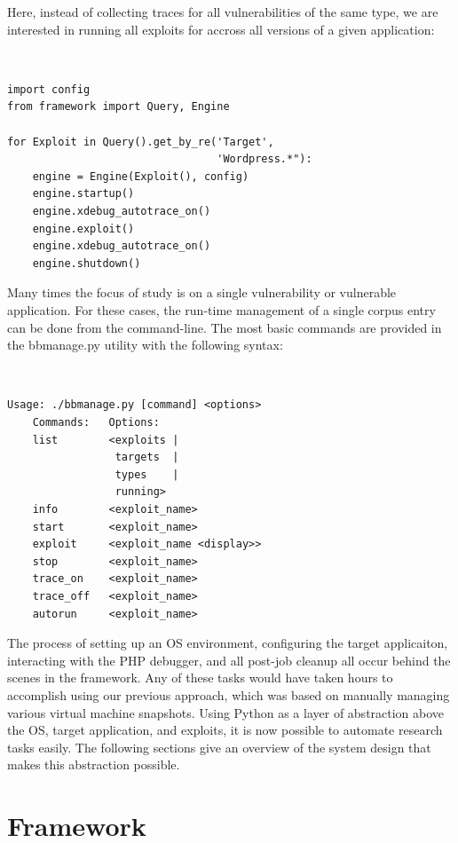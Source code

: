 \documentclass[letterpaper,twocolumn,10pt]{article}
\begin{document}

Here, instead of collecting traces for all vulnerabilities of the same type, we are interested in running all exploits for accross all versions of a given application:

{\tt \footnotesize
\begin{verbatim}
import config
from framework import Query, Engine

for Exploit in Query().get_by_re('Target', 
                                 'Wordpress.*"):
    engine = Engine(Exploit(), config)
    engine.startup()
    engine.xdebug_autotrace_on()
    engine.exploit()
    engine.xdebug_autotrace_on()
    engine.shutdown()
\end{verbatim}
}

Many times the focus of study is on a single vulnerability or vulnerable application. For these cases, the run-time management of a single corpus entry can be done from the command-line. The most basic commands are provided in the bbmanage.py utility with the following syntax:

{\tt \footnotesize
\begin{verbatim}
Usage: ./bbmanage.py [command] <options>
    Commands:   Options:
    list        <exploits | 
                 targets  | 
                 types    | 
                 running>
    info        <exploit_name>
    start       <exploit_name>
    exploit     <exploit_name <display>>
    stop        <exploit_name>
    trace_on    <exploit_name>
    trace_off   <exploit_name>
    autorun     <exploit_name>
\end{verbatim}
}

The process of setting up an OS environment, configuring the target applicaiton, interacting with the PHP debugger, and all post-job cleanup all occur behind the scenes in the framework. Any of these tasks would have taken hours to accomplish using our previous approach, which was based on manually managing various virtual machine snapshots. Using Python as a layer of abstraction above the OS, target application, and exploits, it is now possible to automate research tasks easily. The following sections give an overview of the system design that makes this abstraction possible.\\

\section{Framework}
\end{document}
